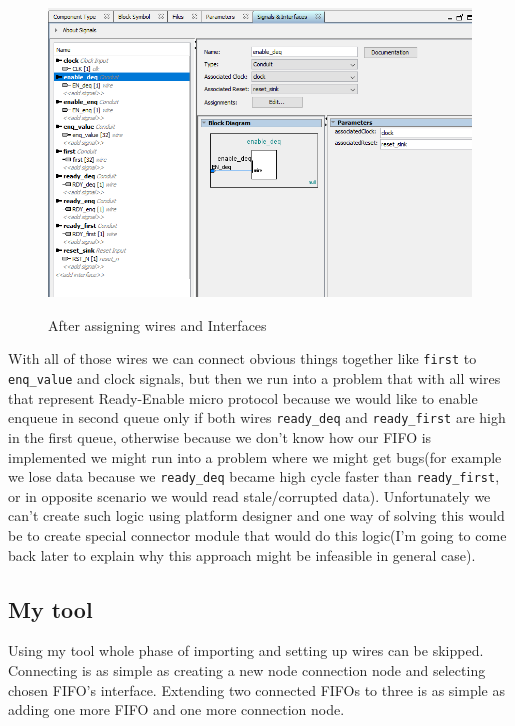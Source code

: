 \documentclass[14pt]{report}
\begin{document}
\begin{figure}
    \caption{After assigning wires and Interfaces}
    \includegraphics[width=\textwidth]{images/Example1AfterOrganization.png} \\
    \centering
\end{figure}

With all of those wires we can connect obvious things together like \verb!first! to \verb!enq_value! and clock signals, but then we run into a problem that with all wires that represent Ready-Enable micro protocol because we would like to enable enqueue in second queue only if both wires \verb!ready_deq! and \verb!ready_first! are high in the first queue, otherwise because we don't know how our FIFO is implemented we might run into a problem where we might get bugs(for example we lose data because we \verb!ready_deq! became high cycle faster than \verb!ready_first!, or in opposite scenario we would read stale/corrupted data). Unfortunately we can't create such logic using platform designer and one way of solving this would be to create special connector module that would do this logic(I'm going to come back later to explain why this approach might be infeasible in general case). 

\subsection{My tool}
Using my tool whole phase of importing and setting up wires can be skipped. Connecting is as simple as creating a new node connection node and selecting chosen FIFO's interface. Extending two connected FIFOs to three is as simple as adding one more FIFO and one more connection node.
\end{document}
